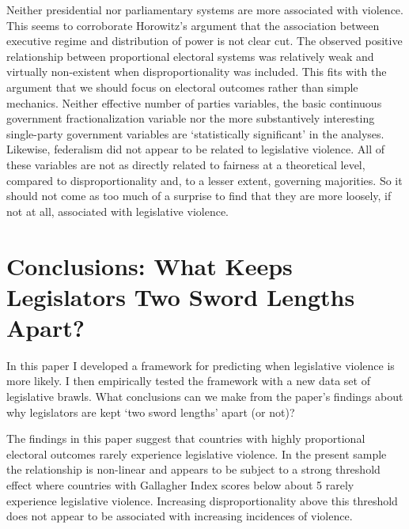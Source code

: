 \documentclass[a4paper]{article}\usepackage{graphicx, color}
\begin{document}
Neither presidential nor parliamentary systems are more associated with violence. This seems to corroborate Horowitz's \citeyearpar{Horowitz1990} argument that the association between executive regime and distribution of power is not clear cut. The observed positive relationship between proportional electoral systems was relatively weak and virtually non-existent when disproportionality was included. This fits with the argument that we should focus on electoral outcomes rather than simple mechanics. Neither effective number of parties variables, the basic continuous government fractionalization variable nor the more substantively interesting single-party government variables are `statistically significant' in the analyses. Likewise, federalism did not appear to be related to legislative violence. All of these variables are not as directly related to fairness at a theoretical level, compared to disproportionality and, to a lesser extent, governing majorities. So it should not come as too much of a surprise to find that they are more loosely, if not at all, associated with legislative violence.

\section*{Conclusions: What Keeps Legislators Two Sword Lengths Apart?}

In this paper I developed a framework for predicting when legislative violence is more likely. I then empirically tested the framework with a new data set of legislative brawls. What conclusions can we make from the paper's findings about why legislators are kept `two sword lengths' apart (or not)?

The findings in this paper suggest that countries with highly proportional electoral outcomes rarely experience legislative violence. In the present sample the relationship is non-linear and appears to be subject to a strong threshold effect where countries with Gallagher Index scores below about 5 rarely experience legislative violence. Increasing disproportionality above this threshold does not appear to be associated with increasing incidences of violence.
\end{document}
